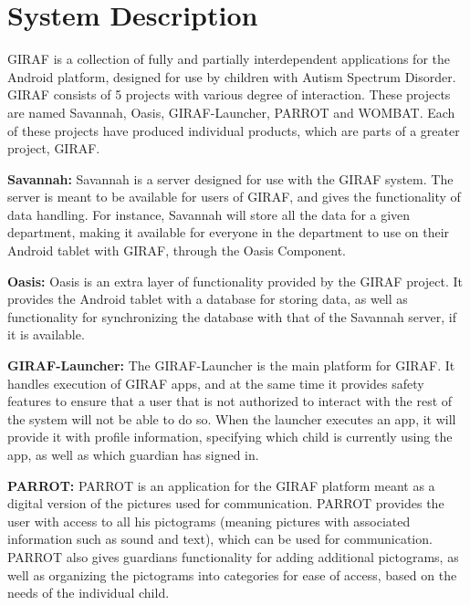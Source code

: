 \section{System Description}
GIRAF is a collection of fully and partially interdependent applications for the Android platform, designed for use by children with Autism Spectrum Disorder.\newline
GIRAF consists of 5 projects with various degree of interaction. These projects are named Savannah, Oasis, GIRAF-Launcher, PARROT and WOMBAT. Each of these projects have produced individual products, which are parts of a greater project, GIRAF.\newline

\textbf{Savannah:} Savannah is a server designed for use with the GIRAF system. The server is meant to be available for users of GIRAF, and gives the functionality of data handling. For instance, Savannah will store all the data for a given department, making it available for everyone in the department to use on their Android tablet with GIRAF, through the Oasis Component.\newline

\textbf{Oasis:} Oasis is an extra layer of functionality provided by the GIRAF project. It provides the Android tablet with a database for storing data, as well as functionality for synchronizing the database with that of the Savannah server, if it is available.\newline

\textbf{GIRAF-Launcher:} The GIRAF-Launcher is the main platform for GIRAF. It handles execution of GIRAF apps, and at the same time it provides safety features to ensure that a user that is not authorized to interact with the rest of the system will not be able to do so. When the launcher executes an app, it will provide it with profile information, specifying which child is currently using the app, as well as which guardian has signed in.\newline

\textbf{PARROT:} PARROT is an application for the GIRAF platform meant as a digital version of the pictures used for communication. PARROT provides the user with access to all his pictograms (meaning pictures with associated information such as sound and text), which can be used for communication. PARROT also gives guardians functionality for adding additional pictograms, as well as organizing the pictograms into categories for ease of access, based on the needs of the individual child.\newline


